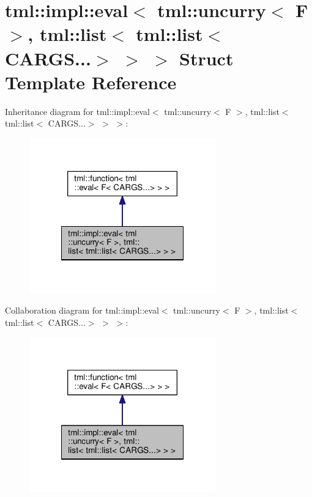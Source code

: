 \hypertarget{structtml_1_1impl_1_1eval_3_01tml_1_1uncurry_3_01_f_01_4_00_01tml_1_1list_3_01tml_1_1list_3_01_c_a_r_g_s_8_8_8_4_01_4_01_4}{\section{tml\+:\+:impl\+:\+:eval$<$ tml\+:\+:uncurry$<$ F $>$, tml\+:\+:list$<$ tml\+:\+:list$<$ C\+A\+R\+G\+S...$>$ $>$ $>$ Struct Template Reference}
\label{structtml_1_1impl_1_1eval_3_01tml_1_1uncurry_3_01_f_01_4_00_01tml_1_1list_3_01tml_1_1list_3_01_c_a_r_g_s_8_8_8_4_01_4_01_4}
}


Inheritance diagram for tml\+:\+:impl\+:\+:eval$<$ tml\+:\+:uncurry$<$ F $>$, tml\+:\+:list$<$ tml\+:\+:list$<$ C\+A\+R\+G\+S...$>$ $>$ $>$\+:
\nopagebreak
\begin{figure}[H]
\begin{center}
\leavevmode
\includegraphics[width=228pt]{structtml_1_1impl_1_1eval_3_01tml_1_1uncurry_3_01_f_01_4_00_01tml_1_1list_3_01tml_1_1list_3_01_c5906dc2a1b19d26bd9c0b0d7db354c4d}
\end{center}
\end{figure}


Collaboration diagram for tml\+:\+:impl\+:\+:eval$<$ tml\+:\+:uncurry$<$ F $>$, tml\+:\+:list$<$ tml\+:\+:list$<$ C\+A\+R\+G\+S...$>$ $>$ $>$\+:
\nopagebreak
\begin{figure}[H]
\begin{center}
\leavevmode
\includegraphics[width=228pt]{structtml_1_1impl_1_1eval_3_01tml_1_1uncurry_3_01_f_01_4_00_01tml_1_1list_3_01tml_1_1list_3_01_cdd45cfe6fb30b869a68fc9c0e910aff6}
\end{center}
\end{figure}
